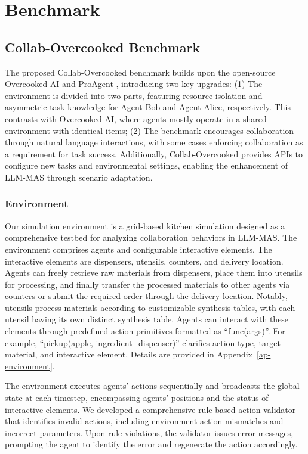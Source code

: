 \documentclass[11pt]{article}
\begin{document}
\section{Benchmark}

\subsection{Collab-Overcooked Benchmark}



The proposed Collab-Overcooked benchmark builds upon the open-source Overcooked-AI \cite{carroll2019utility} and ProAgent \cite{zhang2024proagent}, introducing two key upgrades: (1) The environment is divided into two parts, featuring resource isolation and asymmetric task knowledge for Agent Bob and Agent Alice, respectively. This contrasts with Overcooked-AI, where agents mostly operate in a shared environment with identical items; (2) The benchmark encourages collaboration through natural language interactions, with some cases enforcing collaboration as a requirement for task success. Additionally, Collab-Overcooked provides APIs to configure new tasks and environmental settings, enabling the enhancement of LLM-MAS through scenario adaptation.


\subsubsection{Environment}

Our simulation environment is a grid-based kitchen simulation designed as a comprehensive testbed for analyzing collaboration behaviors in LLM-MAS. The environment comprises agents and configurable interactive elements. The interactive elements are dispensers, utensils, counters, and delivery location. Agents can freely retrieve raw materials from dispensers, place them into utensils for processing, and finally transfer the processed materials to other agents via counters or submit the required order through the delivery location. Notably, utensils process materials according to customizable synthesis tables, with each utensil having its own distinct synthesis table. Agents can interact with these elements through predefined action primitives formatted as ``func(args)''. For example, ``pickup(apple, ingredient\_dispenser)'' clarifies action type, target material, and interactive element. Details are provided in Appendix~\ref{ap-environment}.

The environment executes agents' actions sequentially and broadcasts the global state at each timestep, encompassing agents' positions and the status of interactive elements. We developed a comprehensive rule-based action validator that identifies invalid actions, including environment-action mismatches and incorrect parameters. Upon rule violations, the validator issues error messages, prompting the agent to identify the error and regenerate the action accordingly.
\end{document}
